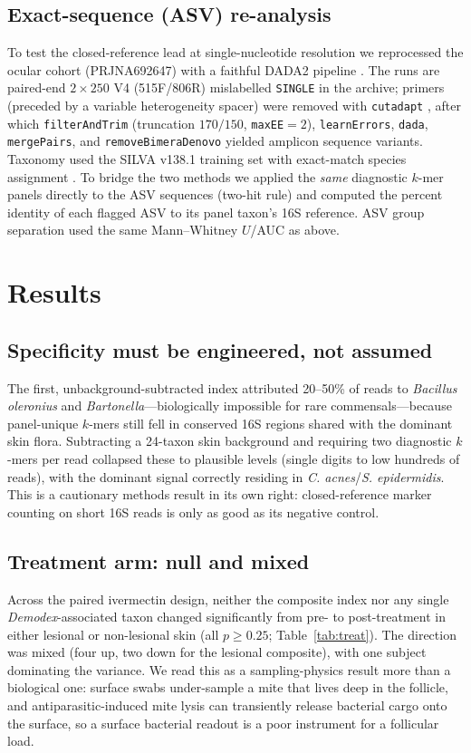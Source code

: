 \documentclass[11pt]{article}
\newcommand{\demodex}{\textit{Demodex}}
\begin{document}
\subsection{Exact-sequence (ASV) re-analysis}\label{sec:dada2}
To test the closed-reference lead at single-nucleotide resolution we reprocessed
the ocular cohort (PRJNA692647) with a faithful DADA2 pipeline
\citep{callahan2016}. The runs are paired-end $2\times250$ V4 (515F/806R)
mislabelled \texttt{SINGLE} in the archive; primers (preceded by a variable
heterogeneity spacer) were removed with \texttt{cutadapt} \citep{martin2011},
after which \texttt{filterAndTrim} (truncation $170/150$, \texttt{maxEE}$=2$),
\texttt{learnErrors}, \texttt{dada}, \texttt{mergePairs}, and
\texttt{removeBimeraDenovo} yielded amplicon sequence variants. Taxonomy used the
SILVA v138.1 training set with exact-match species assignment \citep{quast2013}.
To bridge the two methods we applied the \emph{same} diagnostic $k$-mer panels
directly to the ASV sequences (two-hit rule) and computed the percent identity of
each flagged ASV to its panel taxon's 16S reference. ASV group separation used
the same Mann--Whitney $U$/AUC as above.

\section{Results}

\subsection{Specificity must be engineered, not assumed}
The first, unbackground-subtracted index attributed 20--50\% of reads to
\textit{Bacillus oleronius} and \textit{Bartonella}---biologically impossible for
rare commensals---because panel-unique $k$-mers still fell in conserved 16S
regions shared with the dominant skin flora. Subtracting a 24-taxon skin
background and requiring two diagnostic $k$-mers per read collapsed these to
plausible levels (single digits to low hundreds of reads), with the dominant
signal correctly residing in \textit{C. acnes}/\textit{S. epidermidis}. This is
a cautionary methods result in its own right: closed-reference marker counting
on short 16S reads is only as good as its negative control.

\subsection{Treatment arm: null and mixed}
Across the paired ivermectin design, neither the composite index nor any single
\demodex-associated taxon changed significantly from pre- to post-treatment in
either lesional or non-lesional skin (all $p \ge 0.25$; Table~\ref{tab:treat}).
The direction was mixed (four up, two down for the lesional composite), with one
subject dominating the variance. We read this as a sampling-physics result more
than a biological one: surface swabs under-sample a mite that lives deep in the
follicle, and antiparasitic-induced mite lysis can transiently release bacterial
cargo onto the surface, so a surface bacterial readout is a poor instrument for a
follicular load.
\end{document}
